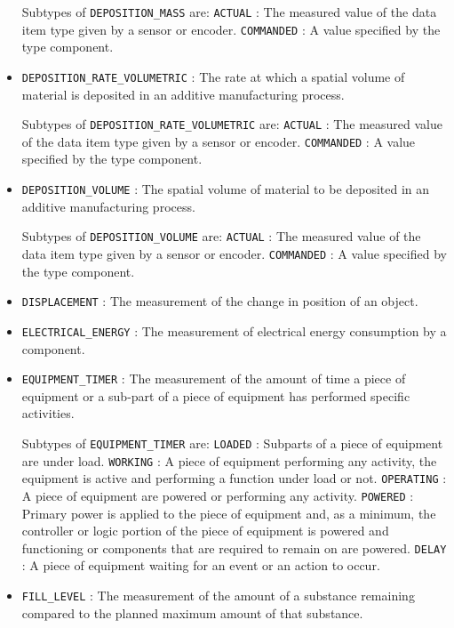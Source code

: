 \begin{itemize}
Subtypes of \texttt{DEPOSITION_MASS} are: 
\newline\tab \texttt{ACTUAL} : The measured value of the data item type given by a sensor or encoder. 
\newline\tab \texttt{COMMANDED} : A value specified by the  type component. 
\item \texttt{DEPOSITION_RATE_VOLUMETRIC} : The rate at which a spatial volume of material is deposited in an additive manufacturing process. 

Subtypes of \texttt{DEPOSITION_RATE_VOLUMETRIC} are: 
\newline\tab \texttt{ACTUAL} : The measured value of the data item type given by a sensor or encoder. 
\newline\tab \texttt{COMMANDED} : A value specified by the  type component. 
\item \texttt{DEPOSITION_VOLUME} : The spatial volume of material to be deposited in an additive manufacturing process. 

Subtypes of \texttt{DEPOSITION_VOLUME} are: 
\newline\tab \texttt{ACTUAL} : The measured value of the data item type given by a sensor or encoder. 
\newline\tab \texttt{COMMANDED} : A value specified by the  type component. 
\item \texttt{DISPLACEMENT} : The measurement of the change in position of an object. 

\item \texttt{ELECTRICAL_ENERGY} : The measurement of electrical energy consumption by a component. 

\item \texttt{EQUIPMENT_TIMER} : The measurement of the amount of time a piece of equipment or a sub-part of a piece of equipment has performed specific activities. 

Subtypes of \texttt{EQUIPMENT_TIMER} are: 
\newline\tab \texttt{LOADED} : Subparts of a piece of equipment are under load. 
\newline\tab \texttt{WORKING} : A piece of equipment performing any activity, the equipment is active and performing a function under load or not. 
\newline\tab \texttt{OPERATING} : A piece of equipment are powered or performing any activity. 
\newline\tab \texttt{POWERED} : Primary  power is  applied  to the  piece  of  equipment and,  as  a minimum, the controller or logic portion of the piece of equipment is powered and functioning or components that are required to remain on are powered. 
\newline\tab \texttt{DELAY} : A piece of equipment waiting for an event or an action to occur. 
\item \texttt{FILL_LEVEL} : The measurement of the amount of a substance remaining compared to the planned maximum amount of that substance. 


\end{itemize}
